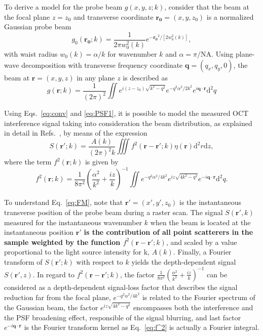 To derive a model for the probe beam $g(x,y,z;k)$, consider that the beam at the focal plane $z=z_0$ and transverse coordinate $\mathbf{r_0} = (x,y,z_0)$ is a normalized Gaussian probe beam
\begin{equation}\label{}
    g_0(\mathbf{r_0}; k) = \frac{1}{2\pi w_0^2(k)}e^{-\mathbf{r_0}^2/[2w_0^2(k)]},
\end{equation}
with waist radius $w_0(k) = \alpha / k$ for wavenumber $k$ and $\alpha = \pi/\text{NA}$. Using plane-wave decomposition with transverse frequency coordinate $\mathbf{q} = (q_x, q_y, 0)$, the beam at $\mathbf{r} = (x, y, z)$ in any plane $z$ is described as~\cite{Ralston2006_Inverse}
\begin{equation}\label{}
    g(\mathbf{r}; k) = \frac{1}{(2\pi)^2} \iint e^{i(z-z_0)\sqrt{k^2 - q^2}} e^{-q^2\alpha^2/2k^2} e^{i\mathbf{q}\cdot\mathbf{r}} \text{d}^2q
\end{equation}

Using Eqs.~\ref{eq:conv} and \ref{eq:PSF1}, it is possible to model the measured OCT interference signal taking into consideration the beam distribution, as explained in detail in Refs.~\cite{Ralston2006_Inverse, Marks2006_Inverse}, by means of the expression
\begin{equation}\label{eq:FM}
    S(\mathbf{r'}; k) = \frac{A(k)}{(2\pi)^2 k} \iiint f^2(\mathbf{r}-\mathbf{r'}; k) \eta(\mathbf{r}) \text{d}^2r \text{d}z,
\end{equation}
where the term $f^2(\mathbf{r}; k)$ is given by
\begin{equation}\label{eq:f^2}
    f^2(\mathbf{r}; k) = \frac{1}{8\pi^2}\left(\frac{\alpha^2}{k^2}+\frac{iz}{k}\right)^{-1} \iint e^{-q^2\alpha^2/4k^2} e^{iz\sqrt{4k^2-q^2}} e^{-i\mathbf{q}\cdot \mathbf{r}} \text{d}^2q.
\end{equation}

To understand Eq.~\ref{eq:FM}, note that $\mathbf{r'}=(x',y',z_0)$ is the instantaneous transverse position of the probe beam during a raster scan. The signal $S(\mathbf{r'},k)$ measured for the instantaneous wavenumber $k$ when the beam is located at the instantaneous position $\mathbf{r'}$ \textbf{is the contribution of all point scatterers in the sample weighted by the function $f^2(\mathbf{r}-\mathbf{r'}; k)$}, and scaled by a value proportional to the light source intensity for k, $A(k)$. Finally, a Fourier transform of $S(\mathbf{r'}; k)$ with respect to $k$ yields the depth-dependent signal $S(\mathbf{r'}, z)$. In regard to $f^2(\mathbf{r}-\mathbf{r'}; k)$, the factor $\frac{1}{8\pi^2}\left(\frac{\alpha^2}{k^2}+\frac{iz}{k}\right)^{-1}$ can be considered as a depth-dependent signal-loss factor that describes the signal reduction far from the focal plane, $e^{-q^2\alpha^2/4k^2}$ is related to the Fourier spectrum of the Gaussian beam, the factor $e^{iz\sqrt{4k^2-q^2}}$ encompasses both the interference and the PSF broadening effect, responsible of the signal blurring, and last factor $e^{-i\mathbf{q}\cdot \mathbf{r}}$ is the Fourier transform kernel as Eq.~\ref{eq:f^2} is actually a Fourier integral.

